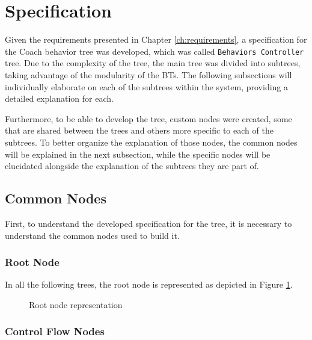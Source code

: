 \section{Specification}
\label{sec:specification}

Given the requirements presented in Chapter \ref{ch:requirements}, a specification for the Coach behavior tree was developed, which was called \texttt{Behaviors Controller} tree. Due to the complexity of the tree, the main tree was divided into subtrees, taking advantage of the modularity of the BTs. The following subsections will individually elaborate on each of the subtrees within the system, providing a detailed explanation for each. 

Furthermore, to be able to develop the tree, custom nodes were created, some that are shared between the trees and others more specific to each of the subtrees. To better organize the explanation of those nodes, the common nodes will be explained in the next subsection, while the specific nodes will be elucidated alongside the explanation of the subtrees they are part of.

\subsection{Common Nodes}
\label{subsec:common_nodes_spec}

First, to understand the developed specification for the tree, it is necessary to understand the common nodes used to build it.

\subsubsection{Root Node}

In all the following trees, the root node is represented as depicted in Figure \ref{fig:root_node_spec}.

\begin{figure}[!h]
    \centering
    \begin{forest}
    \end{forest}
    \caption{Root node representation}
    \label{fig:root_node_spec}
\end{figure}

\subsubsection{Control Flow Nodes}
\label{subsubsec:control_nodes_spec}

